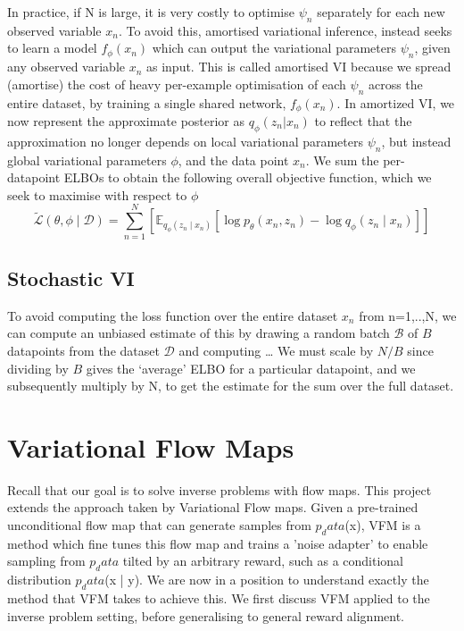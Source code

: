\documentclass[12pt,a4paper]{report}
\begin{document}
In practice, if N is large, it is very costly to optimise $\psi_n$ separately for each new observed variable $x_n$. 
To avoid this, amortised variational inference, instead seeks to learn a model $f_\phi(x_n)$ which can output the variational parameters $\psi_n$, given any observed variable $x_n$ as input. 
This is called amortised VI because we spread (amortise) the cost of heavy per-example optimisation of each $\psi_n$ across the entire dataset, by training a single shared network, $f_\phi(x_n)$. 
In amortized VI, we now represent the approximate posterior as $q_\phi(z_n | x_n)$ to reflect that the approximation no longer depends on local variational parameters $\psi_n$, but instead global variational parameters $\phi$, and the data point $x_n$. 
We sum the per-datapoint ELBOs to obtain the following overall objective function, which we seek to maximise with respect to $\phi$
\begin{equation}
\label{eq:VAE_ELBO}
    \tilde{\mathcal{L}}(\theta, \phi \mid \mathcal{D}) = \sum_{n=1}^N \left[ \mathbb{E}_{q_\phi(z_n \mid x_n)} [\log p_\theta(x_n, z_n) - \log q_\phi(z_n \mid x_n)] \right]
\end{equation}

\subsection{Stochastic VI}
To avoid computing the loss function over the entire dataset $x_n$ from n=1,..,N, we can compute an unbiased estimate of this by drawing a random batch $\mathcal{B}$ of $B$ datapoints from the dataset $\mathcal{D}$ and computing  
\dots %
We must scale by $N/B$ since dividing by $B$ gives the ‘average’ ELBO for a particular datapoint, and we subsequently multiply by N, to get the estimate for the sum over the full dataset. 

\section{Variational Flow Maps}
Recall that our goal is to solve inverse problems with flow maps. 
This project extends the approach taken by Variational Flow maps. 
Given a pre-trained unconditional flow map that can generate samples from $p_data$(x), VFM is a method which fine tunes this flow map and trains a 'noise adapter' to enable sampling from $p_data$ tilted by an arbitrary reward, such as a conditional distribution $p_data$(x | y). 
We are now in a position to understand exactly the method that VFM takes to achieve this. 
We first discuss VFM applied to the inverse problem setting, before generalising to general reward alignment. 
\end{document}
